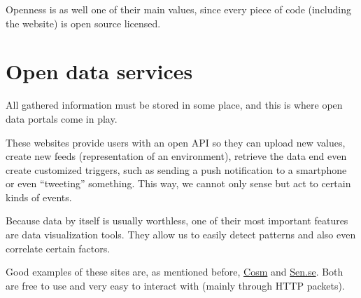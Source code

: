 Openness is as well one of their main values, since every piece of code (including the website) is open source licensed.


\section{Open data services}

All gathered information must be stored in some place, and this is where open data portals come in play. 

These websites provide users with an open API so they can upload new values, create new feeds (representation of an environment), retrieve the data end even create customized triggers, such as sending a push notification to a smartphone or even ``tweeting'' something. This way, we cannot only sense but act to certain kinds of events. 

Because data by itself is usually worthless, one of their most important features are data visualization tools. They allow us to easily detect patterns and also even correlate certain factors.


Good examples of these sites are, as mentioned before, \href{http://www.cosm.com}{Cosm} and \href{http://open.sen.se/}{Sen.se}. Both are free to use and very easy to interact with (mainly through HTTP packets).
